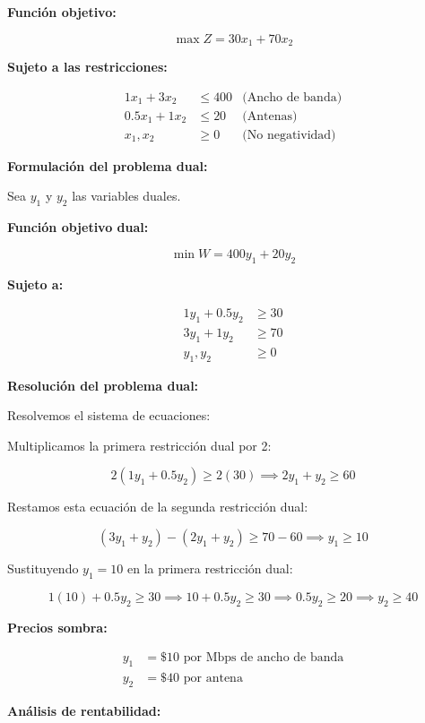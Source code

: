 \documentclass{article}
\begin{document}
\begin{multicols}{2}
\textbf{Función objetivo:}

\[
\max Z = 30x_1 + 70x_2
\]

\textbf{Sujeto a las restricciones:}

\[
\begin{aligned}
1x_1 + 3x_2 &\leq 400 & \text{(Ancho de banda)} \\
0.5x_1 + 1x_2 &\leq 20 & \text{(Antenas)} \\
x_1, x_2 &\geq 0 & \text{(No negatividad)}
\end{aligned}
\]

\textbf{Formulación del problema dual:}

Sea \( y_1 \) y \( y_2 \) las variables duales.

\textbf{Función objetivo dual:}

\[
\min W = 400y_1 + 20y_2
\]

\textbf{Sujeto a:}

\[
\begin{aligned}
1y_1 + 0.5y_2 &\geq 30 \\
3y_1 + 1y_2 &\geq 70 \\
y_1, y_2 &\geq 0
\end{aligned}
\]
    
\end{multicols}

\textbf{Resolución del problema dual:}

Resolvemos el sistema de ecuaciones:

Multiplicamos la primera restricción dual por 2:

\[
2(1y_1 + 0.5y_2) \geq 2(30) \implies 2y_1 + y_2 \geq 60
\]

Restamos esta ecuación de la segunda restricción dual:

\[
(3y_1 + y_2) - (2y_1 + y_2) \geq 70 - 60 \implies y_1 \geq 10
\]

Sustituyendo \( y_1 = 10 \) en la primera restricción dual:

\[
1(10) + 0.5y_2 \geq 30 \implies 10 + 0.5y_2 \geq 30 \implies 0.5y_2 \geq 20 \implies y_2 \geq 40
\]

\textbf{Precios sombra:}

\[
\begin{aligned}
y_1 &= \$10 \text{ por Mbps de ancho de banda} \\
y_2 &= \$40 \text{ por antena}
\end{aligned}
\]

\textbf{Análisis de rentabilidad:}
\end{document}
